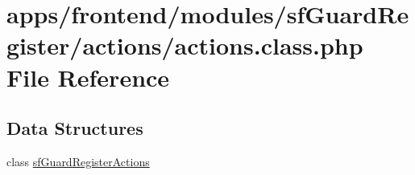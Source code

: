 \hypertarget{frontend_2modules_2sf_guard_register_2actions_2actions_8class_8php}{\section{apps/frontend/modules/sf\-Guard\-Register/actions/actions.class.\-php File Reference}
\label{frontend_2modules_2sf_guard_register_2actions_2actions_8class_8php}
}
\subsection*{Data Structures}
\begin{DoxyCompactItemize}
\item 
class \hyperlink{classsf_guard_register_actions}{sf\-Guard\-Register\-Actions}
\end{DoxyCompactItemize}
